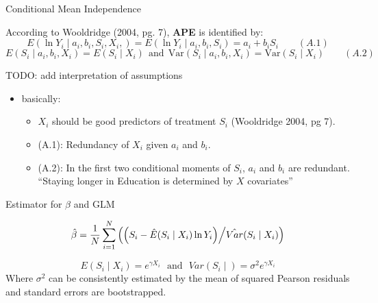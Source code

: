 \documentclass[10pt,ignorenonframetext,]{beamer}
\providecommand{\tightlist}{%
  \setlength{\itemsep}{0pt}\setlength{\parskip}{0pt}}
\begin{document}
\begin{frame}{Conditional Mean Independence}
\protect\hypertarget{conditional-mean-independence}{}

According to Wooldridge (2004, pg. 7), \textbf{APE} is identified by:
\[E (\ln Y_i \mid a_i, b_i, S_i, X_i,) = E (\ln Y_i \mid a_i, b_i, S_i) = a_i+b_i S_i \qquad (A.1)\]
\[E(S_i \mid a_i, b_i, X_i) = E(S_i \mid X_i) ~~\text{and}~~ \mathrm{Var}(S_i \mid 
a_i, b_i, X_i) = \mathrm{Var} (S_i \mid X_i) \qquad (A.2)\]

TODO: add interpretation of assumptions

\begin{itemize}
\item
  basically:

  \begin{itemize}
  \tightlist
  \item
    \(X_i\) should be good predictors of treatment \(S_i\) (Wooldridge
    2004, pg 7).
  \item
    (A.1): Redundancy of \(X_i\) given \(a_i\) and \(b_i\).
  \item
    (A.2): In the first two conditional moments of \(S_i\), \(a_i\) and
    \(b_i\) are redundant. ``Staying longer in Education is determined
    by \(X\) covariates''
  \end{itemize}
\end{itemize}

\end{frame}

\begin{frame}{Estimator for \(\beta\) and GLM}
\protect\hypertarget{estimator-for-beta-and-glm}{}

\[\hat \beta = \frac{1}{N} \sum_{i=1}^N \left( \left( S_i - \hat E (S_i \mid X_i) \ln Y_i \right) \middle/
\hat{Var}(S_i \mid X_i)\right)\]

\[E(S_i \mid X_i ) = e^{\gamma X_i}  ~~~\text{and}~~~ Var(S_i \mid ) = \sigma^2e^{\gamma X_i}\]
Where \(\sigma^2\) can be consistently estimated by the mean of squared
Pearson residuals and standard errors are bootstrapped.

\end{frame}
\end{document}
